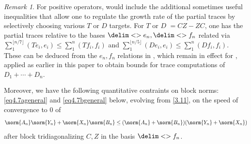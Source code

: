 \documentclass[10pt,reqno]{amsart}
\theoremstyle{remark}
\newtheorem{remark}[theorem]{Remark}
\newcommand{\seq}{\delim<>}
\numberwithin{equation}{section}
\begin{document}
\begin{remark}
  \label{d vs d'}
  For positive operators,  would include the additional sometimes useful inequalities that allow one to regulate the growth rate of the partial traces by selectively choosing various $T$ or $D$ targets.
  For $T$ or $D$ $=CZ-ZC$, one has the partial traces relative to the bases $\seq{e_n},\seq{f_n}$ related via $\sum_1^{\lfloor {n}/{7} \rfloor} (Te_i,e_i) \le \sum_1^n (Tf_i,f_i)$ and $\sum_1^{\lfloor {n}/{5} \rfloor} (De_i,e_i) \le \sum_1^n (Df_i,f_i)$.
  These can be deduced from the $e_n, f_n$ relations in , which remain in effect for , applied as earlier in this paper to obtain bounds for trace computations of $D_1+\cdots + D_n$.

  Moreover, we have the following quantitative contraints on block norms: \eqref{eq4.7ageneral} and \eqref{eq4.7bgeneral} below, evolving from \eqref{3.11}, on the speed of convergence to $0$ of
  \begin{equation*}
    \norm{A_n}\norm{Y_n} + \norm{X_n}\norm{B_n} \le (\norm{A_n}+\norm{B_n})(\norm{Y_n} + \norm{X_n})
  \end{equation*}
  after block tridiagonalizing $C,Z$ in the basis $\seq{f_n}$.


\end{remark}
\end{document}
